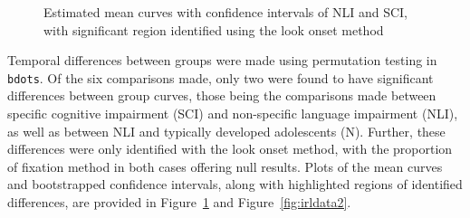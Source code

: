 \documentclass{article}
\newcommand{\xt}{\texttt}
\begin{document}
\begin{figure}[H]
    \centering
    \caption{Estimated mean curves with confidence intervals of NLI and SCI, with significant region identified using the look onset method}
\label{fig:irldata1}
\end{figure}

Temporal differences between groups were made using permutation testing in \xt{bdots}. Of the six comparisons made, only two were found to have significant differences between group curves, those being the comparisons made between specific cognitive impairment (SCI) and non-specific language impairment (NLI), as well as between NLI and typically developed adolescents (N). Further, these differences were only identified with the look onset method, with the proportion of fixation method in both cases offering null results. Plots of the mean curves and bootstrapped confidence intervals, along with highlighted regions of identified differences, are provided in Figure~\ref{fig:irldata1} and Figure~\ref{fig:irldata2}.
\end{document}
